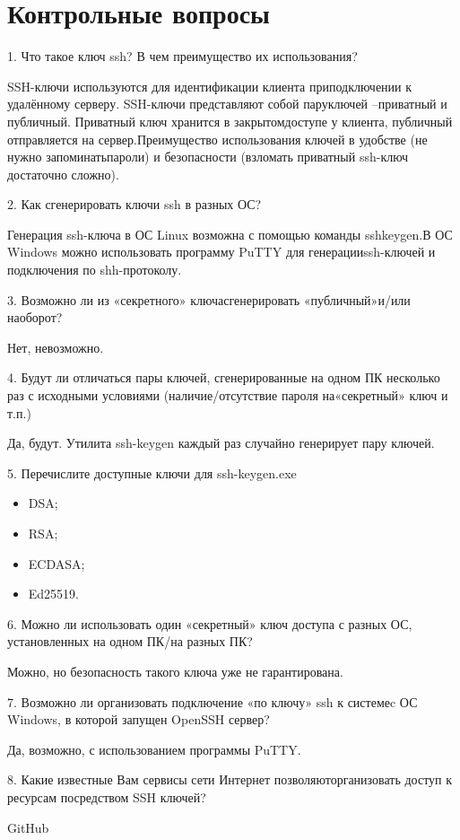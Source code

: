 \section*{Контрольные вопросы}

1. Что такое ключ ssh? В чем преимущество их использования?

SSH-ключи  используются  для  идентификации  клиента  приподключении к удалённому серверу. SSH-ключи представляют собой паруключей –приватный и публичный. Приватный ключ хранится в закрытомдоступе  у  клиента,  публичный  отправляется  на  сервер.Преимущество использования ключей в удобстве (не нужно запоминатьпароли) и безопасности (взломать приватный ssh-ключ достаточно сложно).

2. Как сгенерировать ключи ssh в разных ОС?

Генерация ssh-ключа в ОС Linux возможна с помощью команды sshkeygen.В ОС  Windows  можно  использовать  программу  PuTTY  для  генерацииssh-ключей и подключения по shh-протоколу.

3. Возможно ли из «секретного» ключасгенерировать «публичный»и/или наоборот?

Нет, невозможно.

4. Будут ли отличаться пары ключей, сгенерированные на одном ПК несколько  раз  с  исходными  условиями  (наличие/отсутствие  пароля  на«секретный» ключ и т.п.)

Да, будут. Утилита ssh-keygen каждый раз случайно генерирует пару ключей.

5. Перечислите доступные ключи для ssh-keygen.exe

\begin{itemize}
    \item DSA;
    \item RSA;
    \item ECDASA;
    \item Ed25519.
\end{itemize}

6. Можно ли использовать один «секретный» ключ доступа с разных ОС, установленных на одном ПК/на разных ПК?

Можно, но безопасность такого ключа уже не гарантирована.

7. Возможно ли организовать подключение «по ключу» ssh к системеc ОС Windows, в которой запущен OpenSSH сервер?

Да, возможно, с использованием программы PuTTY.

8. Какие известные Вам сервисы сети Интернет позволяюторганизовать доступ к ресурсам посредством SSH ключей?

GitHub